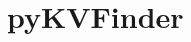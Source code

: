 \documentclass[Ingles]{phdthesis}
\def\eg{e.g.\onedot}
\begin{document}


\section{pyKVFinder}

\end{document}
